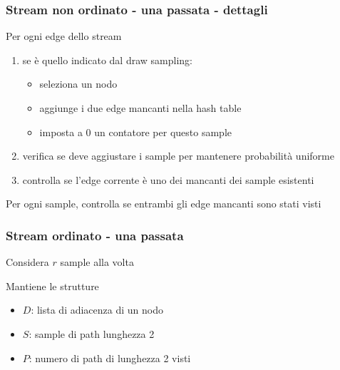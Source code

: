 \documentclass{beamer}
\begin{document}
\begin{frame}
\frametitle{Stream non ordinato - una passata - dettagli}

Per ogni edge dello stream
\begin{enumerate}
    \item se è quello indicato dal draw sampling:
        \begin{itemize}
            \item seleziona un nodo
            \item aggiunge i due edge mancanti nella hash table
            \item imposta a 0 un contatore per questo sample
        \end{itemize}
    \item 
verifica se deve aggiustare i sample per mantenere probabilità uniforme
    \item 
controlla se l'edge corrente è uno dei mancanti dei sample esistenti
\end{enumerate}

Per ogni sample, controlla se entrambi gli edge mancanti sono stati visti

\end{frame}

\begin{frame}
\frametitle{Stream ordinato - una passata}

Considera $r$ sample alla volta

Mantiene le strutture
\begin{itemize}
    \item $D$: lista di adiacenza di un nodo
    \item $S$: sample di path lunghezza 2
    \item $P$: numero di path di lunghezza 2 visti
\end{itemize}

\end{frame}
\end{document}
